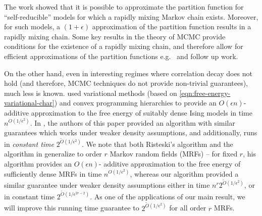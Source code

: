 \documentclass[final, 12pt]{colt2018}
\theoremstyle{definition}
\newtheorem{remark}[theorem]{Remark}
\theoremstyle{plain}
\begin{document}
The work \citep{JerrumSinclair:89b} showed that it is possible to approximate the partition function for 
``self-reducible'' models for which a rapidly mixing Markov chain exists. Moreover, for such models, a 
$(1+\epsilon)$ approximation of the partition function results in a rapidly mixing chain. 
Some key results in the theory of MCMC provide conditions for the existence of a rapidly 
mixing chain, and therefore allow for efficient approximations of the partition functions e.g.~\citep{JerrumSinclair:89, JerrumSinclair:90, JeSiVi:04} and follow up work. 

On the other hand, even in interesting regimes where correlation decay does not hold (and therefore, MCMC techniques do not provide non-trivial guarantees), much less is known. \citep{risteski-ising} used variational methods (based on \cref{eqn:free-energy-variational-char}) and convex programming hierarchies to provide an $O(\epsilon n)$-additive approximation to the free energy of suitably dense Ising models in time $n^{O(1/\epsilon^2)}$. In \citep{previous-paper}, the authors of this paper provided an algorithm with similar guarantees which works under weaker density assumptions, and additionally, runs in \emph{constant time} $2^{\tilde{O}(1/\epsilon^2)}$. We note that both Risteski's algorithm and the algorithm in \citep{previous-paper} generalize to order $r$ Markov random fields (MRFs) -- for fixed $r$, his algorithm provides an $O(\epsilon n)$- additive approximation to the free energy of sufficiently dense MRFs in time $n^{O(1/\epsilon^2)}$, whereas our algorithm provided a similar guarantee under weaker density assumptions either in time $n^{r}2^{\tilde{O}(1/\epsilon^{2})}$, or in constant time $2^{\tilde{O}(1/\epsilon^{2r-2})}$. As one of the applications of our main result, we will improve this running time guarantee to $2^{\tilde{O}(1/\epsilon^{2})}$ for all order $r$ MRFs. 

\end{document}
